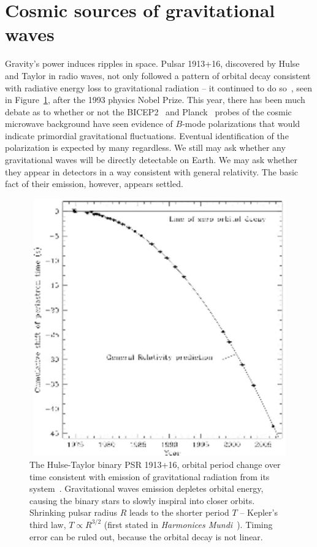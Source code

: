         
        \section{Cosmic sources of gravitational waves}
        \label{cosmic_sources}
      

		Gravity's power induces ripples in space. 
Pulsar 1913+16, discovered by Hulse and Taylor in radio waves, not only followed a pattern of orbital decay consistent with radiative energy loss to gravitational radiation -- it continued to do so~\cite{WeisbergTaylor2004,Weisberg2010}, seen in Figure~\ref{Hulse-Taylor_binary}, after the 1993 physics Nobel Prize. 
This year, there has been much debate as to whether or not the BICEP2~\cite{BICEP2014} and Planck~\cite{Planck2014} probes of the cosmic microwave background have seen evidence of $B$-mode polarizations that would indicate primordial gravitational fluctuations.
Eventual identification of the polarization is expected by many regardless. 
We still may ask whether any gravitational waves will be directly detectable on Earth. 
We may ask whether they appear in detectors in a way consistent with general relativity. 
The basic fact of their emission, however, appears settled.

	\begin{figure}
	\begin{center}
	\includegraphics[height=111mm, width=148mm]{500px-PSR_B1913+16_period_shift_graph.eps}
	\caption{The Hulse-Taylor binary PSR 1913+16, orbital period change over time consistent with emission of gravitational radiation from its system~\cite{Weisberg2010}. Gravitational waves emission depletes orbital energy, causing the binary stars to slowly inspiral into closer orbits. Shrinking pulsar radius $R$ leads to the shorter period $T$ -- Kepler's third law, $T \propto R^{3/2}$ (first stated in \textit{Harmonices Mundi}~\cite{Hawking2002}). Timing error can be ruled out, because the orbital decay is not linear.}
	\label{Hulse-Taylor_binary}
	\end{center}
	\end{figure}

